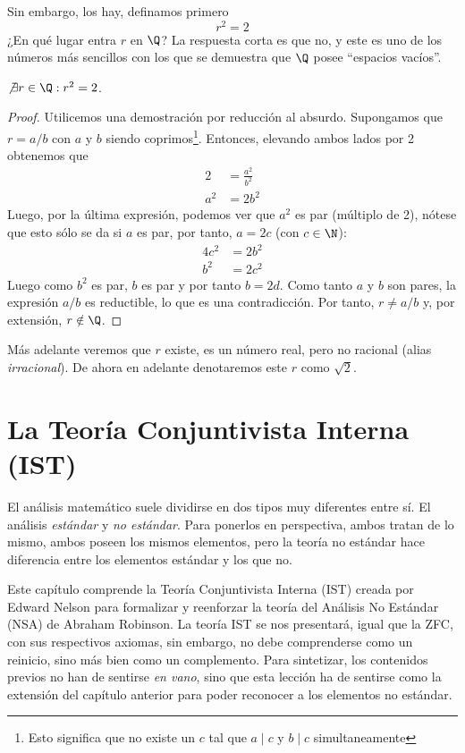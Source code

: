 \documentclass[11pt,oneside,a4paper]{book}
\begin{document}
Sin embargo, los hay, definamos primero
$$r^2=2$$
¿En qué lugar entra $r$ en $\Q$? La respuesta corta es que no, y este es uno de los números más sencillos con los que se demuestra que $\Q$ posee ``espacios vacíos''.
\begin{thm}
$\not\exists r\in\Q:r^2=2$.
\end{thm}
\begin{proof}
Utilicemos una demostración por reducción al absurdo. Supongamos que $r=a/b$ con $a$ y $b$ siendo coprimos\footnote{Esto significa que no existe un $c$ tal que $a\mid c$ y $b\mid c$ simultaneamente}. Entonces, elevando ambos lados por 2 obtenemos que
\begin{align*}
2&=\frac{a^2}{b^2}\\
a^2&=2b^2
\end{align*}
Luego, por la última expresión, podemos ver que $a^2$ es par (múltiplo de 2), nótese que esto sólo se da si $a$ es par, por tanto, $a=2c$ (con $c\in\N$):
\begin{align*}
4c^2&=2b^2\\
b^2&=2c^2
\end{align*}
Luego como $b^2$ es par, $b$ es par y por tanto $b=2d$. Como tanto $a$ y $b$ son pares, la expresión $a/b$ es reductible, lo que es una contradicción. Por tanto, $r\neq a/b$ y, por extensión, $r\notin\Q$.
\end{proof}
Más adelante veremos que $r$ existe, es un número real, pero no racional (alias \textit{irracional}). De ahora en adelante denotaremos este $r$ como $\sqrt{2}$.

\section{La Teoría Conjuntivista Interna (IST)}
El análisis matemático suele dividirse en dos tipos muy diferentes entre sí. El análisis \textit{estándar} y \textit{no estándar}. Para ponerlos en perspectiva, ambos tratan de lo mismo, ambos poseen los mismos elementos, pero la teoría no estándar hace diferencia entre los elementos estándar y los que no.

Este capítulo comprende la Teoría Conjuntivista Interna (IST) creada por Edward Nelson para formalizar y reenforzar la teoría del Análisis No Estándar (NSA) de Abraham Robinson. La teoría IST se nos presentará, igual que la ZFC, con sus respectivos axiomas, sin embargo, no debe comprenderse como un reinicio, sino más bien como un complemento. Para sintetizar, los contenidos previos no han de sentirse \textit{en vano}, sino que esta lección ha de sentirse como la extensión del capítulo anterior para poder reconocer a los elementos no estándar.
\end{document}
